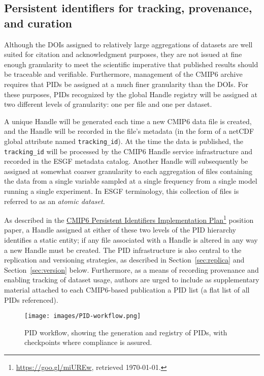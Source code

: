 \documentclass[gmd,manuscript]{copernicus}
\newcommand{\urlref}[2] {\href{#1}{#2}\footnote{\url{#1}, retrieved \today.}}
\begin{document}
\subsection{Persistent identifiers for tracking, provenance, and
  curation}
\label{sec:pid}

Although the DOIs assigned to relatively large aggregations of
datasets are well suited for citation and acknowledgment purposes,
they are not issued at fine enough granularity to meet the scientific
imperative that published results should be traceable and verifiable.
Furthermore, management of the CMIP6 archive requires that PIDs be
assigned at a much finer granularity than the DOIs. For these
purposes, PIDs recognized by the global Handle registry will be
assigned at two different levels of granularity: one per file and 
one per dataset.

A unique Handle will be generated each time a new CMIP6 data file is
created, and the Handle will be recorded in the file's metadata (in
the form of a netCDF global attribute named \texttt{tracking\_id}). At
the time the data is published, the \texttt{tracking\_id} will be
processed by the CMIP6 Handle service infrastructure and recorded in
the ESGF metadata catalog. Another Handle will subsequently be
assigned at somewhat coarser granularity to each aggregation of files
containing the data from a single variable sampled at a single
frequency
from a single model running a single experiment. In ESGF terminology,
this collection of files is referred to as an \emph{atomic dataset}.

As described in the \urlref{https://goo.gl/miUREw}{CMIP6 Persistent
  Identifiers Implementation Plan} position paper, a Handle assigned
at either of these two levels of the PID hierarchy identifies a static
entity; if any file associated with a Handle is altered in any way a
new Handle must be created. The PID infrastructure is also central to
the replication and versioning strategies, as described in
Section~\ref{sec:replica} and Section~\ref{sec:version} below.
Furthermore, as a means of recording provenance and enabling tracking
of dataset usage, authors are urged to include as supplementary
material attached to each CMIP6-based publication a PID list (a flat
list of all PIDs referenced).

\begin{figure*}
  \begin{center}
    \texttt{[image: images/PID-workflow.png]}
  \end{center}
  \caption{PID workflow, showing the generation and registry of PIDs,
    with checkpoints where compliance is assured.}
  \label{fig:pidflow}
\end{figure*}
\end{document}
